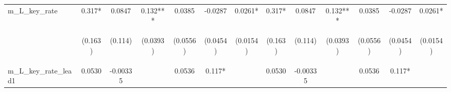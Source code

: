 \documentclass[]{article}
\begin{document}
\begin{center}
\begin{tabular}{lcccccccccccc}
m\_L\_key\_rate & 0.317* & 0.0847 & 0.132*** & 0.0385 & -0.0287 & 0.0261* & 0.317* & 0.0847 & 0.132*** & 0.0385 & -0.0287 & 0.0261* \\
\vspace{4pt} & \begin{footnotesize}(0.163)\end{footnotesize} & \begin{footnotesize}(0.114)\end{footnotesize} & \begin{footnotesize}(0.0393)\end{footnotesize} & \begin{footnotesize}(0.0556)\end{footnotesize} & \begin{footnotesize}(0.0454)\end{footnotesize} & \begin{footnotesize}(0.0154)\end{footnotesize} & \begin{footnotesize}(0.163)\end{footnotesize} & \begin{footnotesize}(0.114)\end{footnotesize} & \begin{footnotesize}(0.0393)\end{footnotesize} & \begin{footnotesize}(0.0556)\end{footnotesize} & \begin{footnotesize}(0.0454)\end{footnotesize} & \begin{footnotesize}(0.0154)\end{footnotesize} \\
m\_L\_key\_rate\_lead1 & 0.0530 & -0.00335 &  & 0.0536 & 0.117* &  & 0.0530 & -0.00335 &  & 0.0536 & 0.117* &  \\

\end{tabular}
\end{center}
\end{document}
